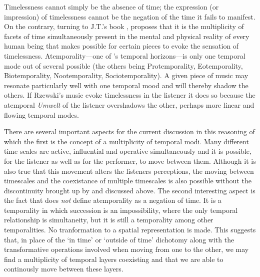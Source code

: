 Timelessness cannot simply be the absence of time; the expression (or impression) of timelessness cannot be the negation of the time it fails to manifest. On the contrary, turning to J.T.\citeauthor{fraser90}'s  book , \citeauthor{kramer88} proposes that it is the multiplicity of facets of time simultaneously present in the mental and physical reality of every human being that makes possible for certain pieces to evoke the sensation of timelessness. Atemporality---one of \citeauthor{fraser90}'s temporal horizons---is only one temporal mode out of several possible (the others being Protemporality, Eotemporality, Biotemporality, Nootemporality, Sociotemporality). A given piece of music may resonate particularly well with one temporal mood and will thereby shadow the others. If Rzewski's music evoke timelessness in the listener it does so because the atemporal \emph{Umwelt} of the listener overshadows the other, perhaps more linear and flowing temporal modes.

There are several important aspects for the current discussion in this reasoning of which the first is the concept of a multiplicity of temporal modi. Many different time scales are active, influential and operative simultaneously and it is possible, for the listener as well as for the performer, to move between them. Although it is also true that this movement alters the listeners perceptions, the moving between timescales and the coexistance of multiple timescales is also possible without the discontinuity brought up by \citeauthor{roads} and discussed above. The second interesting aspect is the fact that \citeauthor{fraser90} does \emph{not} define atemporality as a negation of time. It is a temporality in which succession is an impossibility, where the only temporal relationship is simultaneity, but it is still a temporality among other temporalities. No tranformation to a spatial representation is made. This suggests that, in place of the `in time' or `outside of time' dichotomy along with the transformative operations involved when moving from one to the other, we may find a multiplicity of temporal layers coexisting and that we are able to continously move between these layers. 



